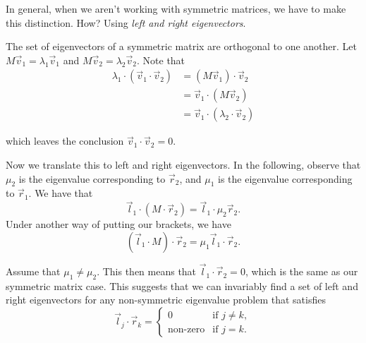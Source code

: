 \documentclass[a4paper, 12pt,oneside,openany]{book}
\begin{document}
In general, when we aren't working with symmetric matrices, we have to make this distinction. How? Using \emph{left and right eigenvectors}.


The set of eigenvectors of a symmetric matrix are orthogonal to one another. Let $M \vec{v}_1 = \lambda_1 \vec{v}_1$ and $M \vec{v}_2 = \lambda_2 \vec{v}_2$. Note that \begin{align*} \lambda_1 \cdot (\vec{v}_1 \cdot \vec{v}_2) &= (M \vec{v}_1) \cdot \vec{v}_2 \\ &= \vec{v}_1 \cdot (M \vec{v}_2) \\ &= \vec{v}_1 \cdot (\lambda_2 \cdot \vec{v}_2)\end{align*}

which leaves the conclusion $\vec{v}_1 \cdot \vec{v}_2 =0$. 

Now we translate this to left and right eigenvectors. In the following, observe that $\mu_2$ is the eigenvalue corresponding to $\vec{r}_2$, and $\mu_1$ is the eigenvalue corresponding to $\vec{r}_1$. We have that $$\vec{l}_1 \cdot (M \cdot \vec{r}_2) =  \vec{l}_1 \cdot \mu_2 \vec{r}_2.$$ Under another way of putting our brackets, we have $$(\vec{l}_1 \cdot M) \cdot \vec{r}_2 = \mu_1 \vec{l}_1 \cdot \vec{r}_2.$$ 

Assume that $\mu_1 \neq \mu_2$. This then means that $\vec{l}_1 \cdot \vec{r}_2=0$, which is the same as our symmetric matrix case. This suggests that we can invariably find a set of left and right eigenvectors for any non-symmetric eigenvalue problem that satisfies \[
\vec{l}_j \cdot \vec{r}_k =
\begin{cases}
0 & \text{if } j \neq k, \\
\text{non-zero} & \text{if } j = k.
\end{cases}
\]
\end{document}
